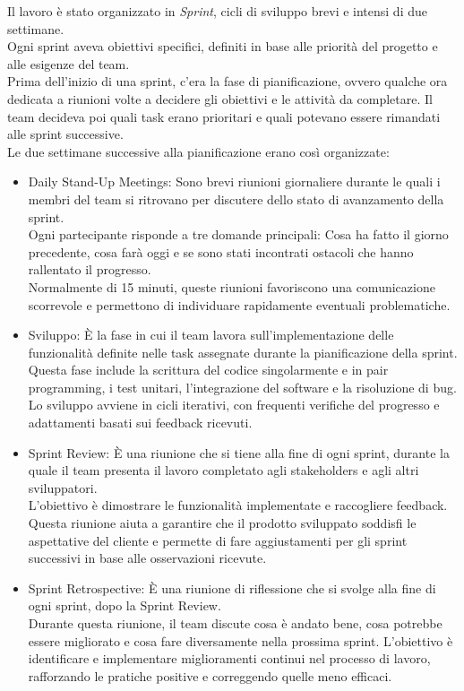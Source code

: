Il lavoro è stato organizzato in \textit{Sprint}, cicli di sviluppo brevi e
intensi di due settimane.\\ Ogni sprint aveva obiettivi specifici, definiti in base
alle priorità del progetto e alle esigenze del team.\\ Prima dell'inizio di una sprint,
c'era la fase di pianificazione, ovvero qualche ora dedicata a riunioni volte a decidere
gli obiettivi e le attività da completare. Il team decideva poi quali task erano
prioritari e quali potevano essere rimandati alle sprint successive.\\ Le due
settimane successive alla pianificazione erano così organizzate:
\begin{itemize}
  \item Daily Stand-Up Meetings: Sono brevi riunioni giornaliere durante le
    quali i membri del team si ritrovano per discutere dello stato di
    avanzamento della sprint.\\ Ogni partecipante risponde a tre domande
    principali: Cosa ha fatto il giorno precedente, cosa farà oggi e se sono
    stati incontrati ostacoli che hanno rallentato il progresso.\\ Normalmente
    di 15 minuti, queste riunioni favoriscono una comunicazione scorrevole e permettono
    di individuare rapidamente eventuali problematiche.

  \item Sviluppo: È la fase in cui il team lavora sull'implementazione delle
    funzionalità definite nelle task assegnate durante la pianificazione della
    sprint.\\ Questa fase include la scrittura del codice singolarmente e in
    pair programming, i test unitari, l'integrazione del software e la
    risoluzione di bug.\\ Lo sviluppo avviene in cicli iterativi, con frequenti verifiche
    del progresso e adattamenti basati sui feedback ricevuti.

  \item Sprint Review: È una riunione che si tiene alla fine di ogni sprint, durante
    la quale il team presenta il lavoro completato agli stakeholders e agli altri
    sviluppatori.\\ L'obiettivo è dimostrare le funzionalità implementate e raccogliere
    feedback.\\ Questa riunione aiuta a garantire che il prodotto sviluppato soddisfi
    le aspettative del cliente e permette di fare aggiustamenti per gli sprint successivi
    in base alle osservazioni ricevute.

  \item Sprint Retrospective: È una riunione di riflessione che si svolge alla
    fine di ogni sprint, dopo la Sprint Review.\\ Durante questa riunione, il
    team discute cosa è andato bene, cosa potrebbe essere migliorato e cosa fare
    diversamente nella prossima sprint. L'obiettivo è identificare e
    implementare miglioramenti continui nel processo di lavoro, rafforzando le pratiche
    positive e correggendo quelle meno efficaci.
\end{itemize}

